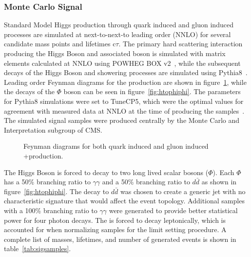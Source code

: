 \subsubsection{Monte Carlo Signal} \label{sec:ana_mcsig}
Standard Model Higgs production through quark induced and gluon induced \ZH processes are simulated at next-to-next-to leading order (NNLO) for several candidate mass points \mphi and lifetimes c$\tau$. The primary hard scattering interaction producing the Higgs Boson and associated \VZ boson is simulated with matrix elements calculated at NNLO using POWHEG BOX v2~\cite{powheg}, while the subsequent decays of the Higgs Boson and showering processes are simulated using Pythia8~\cite{pythia8}. Leading order Feynman diagrams for the \ZH production are shown in figure~\ref{fig:ZH_feynman}, while the decays of the $\Phi$ boson can be seen in figure~\ref{fig:htophiphi}. The parameters for Pythia8 simulations were set to TuneCP5, which were the optimal values for agreement with measured data at NNLO at the time of producing the samples~\cite{tunecp5}. The simulated signal samples were produced centrally by the Monte Carlo and Interpretation subgroup of CMS.

\begin{figure}[htb!]
	\centering
	\begingroup
	\hfill
	
	\hfill
	
	\hfill
	
	\hfill
	\endgroup
	\caption[Feynman diagrams for both quark induced and gluon induced \VZ+\VH production.]{Feynman diagrams for both quark induced and gluon induced \VZ+\VH production.}
	\label{fig:ZH_feynman}
\end{figure}

The Higgs Boson is forced to decay to two long lived scalar bosons ($\Phi$). Each $\Phi$ has a 50\% branching ratio to $\gamma\gamma$ and a 50\% branching ratio to $d\bar{d}$ as shown in figure~\ref{fig:htophiphi}. The decay to $d\bar{d}$ was chosen to create a generic jet with no characteristic signature that would affect the event topology. Additional samples with a 100\% branching ratio to $\gamma\gamma$ were generated to provide better statistical power for four photon decays. The \VZ is forced to decay leptonically, which is accounted for when normalizing samples for the limit setting procedure. A complete list of masses, lifetimes, and number of generated events is shown in table~\ref{tab:sigsamples}.


